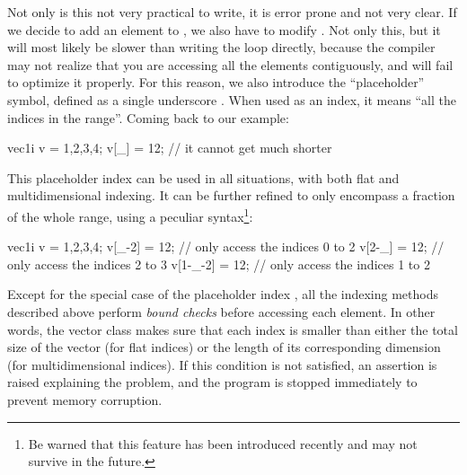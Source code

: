 \documentclass[12pt]{report}
\begin{document}
Not only is this not very practical to write, it is error prone and not very clear. If we decide to add an element to , we also have to modify . Not only this, but it will most likely be slower than writing the loop directly, because the compiler may not realize that you are accessing all the elements contiguously, and will fail to optimize it properly. For this reason, we also introduce the ``placeholder'' symbol, defined as a single underscore \cppinline{_}. When used as an index, it means ``all the indices in the range''. Coming back to our example:

\begin{cppcode}
vec1i v = {1,2,3,4};
v[_] = 12; // it cannot get much shorter
\end{cppcode}

This placeholder index can be used in all situations, with both flat and multidimensional indexing. It can be further refined to only encompass a fraction of the whole range, using a peculiar syntax\footnote{Be warned that this feature has been introduced recently and may not survive in the future.}:

\begin{cppcode}
vec1i v = {1,2,3,4};
v[_-2] = 12;   // only access the indices 0 to 2
v[2-_] = 12;   // only access the indices 2 to 3
v[1-_-2] = 12; // only access the indices 1 to 2
\end{cppcode}

Except for the special case of the placeholder index \cppinline{_}, all the indexing methods described above perform \emph{bound checks} before accessing each element. In other words, the vector class makes sure that each index is smaller than either the total size of the vector (for flat indices) or the length of its corresponding dimension (for multidimensional indices). If this condition is not satisfied, an assertion is raised explaining the problem, and the program is stopped immediately to prevent memory corruption.
\end{document}
